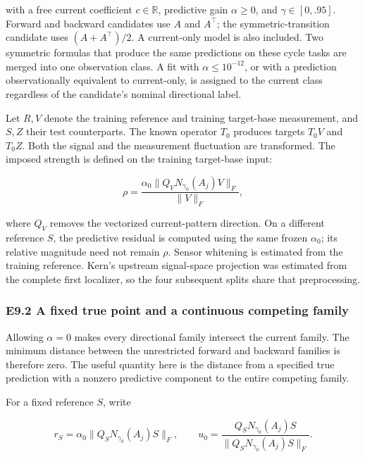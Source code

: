 \documentclass[11pt,a4paper]{article}
\begin{document}
with a free current coefficient \(c\in\mathbb R\), predictive gain
\(\alpha\geq0\), and \(\gamma\in[0,.95]\). Forward and backward
candidates use \(A\) and \(A^\top\); the symmetric-transition candidate
uses \((A+A^\top)/2\). A current-only model is also included. Two
symmetric formulas that produce the same predictions on these cycle
tasks are merged into one observation class. A fit with
\(\alpha\leq10^{-12}\), or with a prediction observationally equivalent
to current-only, is assigned to the current class regardless of the
candidate's nominal directional label.

\par
\noindent\begin{minipage}{\linewidth}

Let \(R,V\) denote the training reference and training target-base
measurement, and \(S,Z\) their test counterparts. The known operator
\(T_0\) produces targets \(T_0V\) and \(T_0Z\). Both the signal and the
measurement fluctuation are transformed. The imposed strength is defined
on the training target-base input:

\[
\rho=\frac{\alpha_0\|Q_VN_{\gamma_0}(A_j)V\|_F}{\|V\|_F},
\]

\end{minipage}\par

where \(Q_V\) removes the vectorized current-pattern direction. On a
different reference \(S\), the predictive residual is computed using the
same frozen \(\alpha_0\); its relative magnitude need not remain
\(\rho\). Sensor whitening is estimated from the training reference.
Kern's upstream signal-space projection was estimated from the complete
first localizer, so the four subsequent splits share that preprocessing.

\subsubsection{E9.2 A fixed true point and a continuous competing
family}\label{e9.2-a-fixed-true-point-and-a-continuous-competing-family}

Allowing \(\alpha=0\) makes every directional family intersect the
current family. The minimum distance between the unrestricted forward
and backward families is therefore zero. The useful quantity here is the
distance from a specified true prediction with a nonzero predictive
component to the entire competing family.

\par
\noindent\begin{minipage}{\linewidth}

For a fixed reference \(S\), write

\[
r_S=\alpha_0\|Q_SN_{\gamma_0}(A_j)S\|_F,
\qquad
u_0=\frac{Q_SN_{\gamma_0}(A_j)S}{\|Q_SN_{\gamma_0}(A_j)S\|_F}.
\]

\end{minipage}\par
\end{document}
